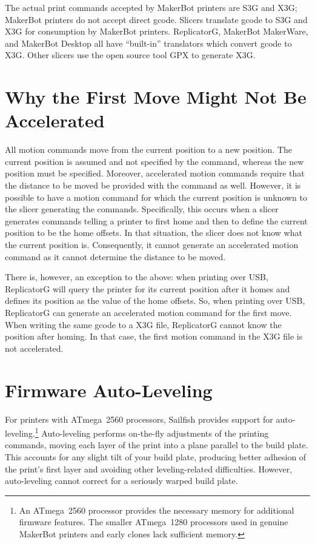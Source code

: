 The actual print commands accepted by MakerBot
printers are S3G and X3G; MakerBot printers do not accept direct \gls{gcode}.
Slicers translate gcode to S3G and X3G for consumption by MakerBot printers.
ReplicatorG, MakerBot MakerWare, and MakerBot Desktop all have ``built-in''
translators which convert gcode to X3G.  Other slicers use the open source tool
GPX to generate X3G.


\section{Why the First Move Might Not Be Accelerated} \label{sec:first-move}

All motion commands move from the current position to a new position.  The
current position is assumed and not specified by the command, whereas the
new position must be specified.  Moreover, accelerated motion commands require
that the distance to be moved be provided with the command as well.  However,
it is possible to have a motion command for which the current position is
unknown to the \gls{slicer} generating the commands.  Specifically, this
occurs when a slicer generates commands telling a printer to first home and
then to define the current position to be the \glspl{home offset}.  In that
situation, the slicer does not know what the current position is. Consequently,
it cannot generate an accelerated motion command as it cannot determine the
distance to be moved.

There is, however, an exception to the above: when printing over USB,
ReplicatorG will query the printer for its current position after it
homes and defines its position as the value of the home offsets.  So,
when printing over USB, ReplicatorG can generate an accelerated motion
command for the first move.  When writing the same gcode to a X3G file,
ReplicatorG cannot know the position after homing.  In that case, the
first motion command in the X3G file is not accelerated.


\section{Firmware Auto-Leveling} \label{sec:auto-leveling}

For printers with ATmega~2560 processors, Sailfish provides support for
auto-leveling.\footnote{An ATmega~2560 processor provides the necessary memory
for additional firmware features.  The smaller ATmega~1280 processors used
in genuine MakerBot printers and early clones lack sufficient memory.}
Auto-leveling performs on-the-fly adjustments of the printing commands, moving
each layer of the print into a plane parallel to the build
plate.  This accounts for any slight tilt of your build plate, producing
better adhesion of the print's first layer and avoiding other leveling-related
difficulties.  However, auto-leveling cannot correct for a seriously warped
build plate.

